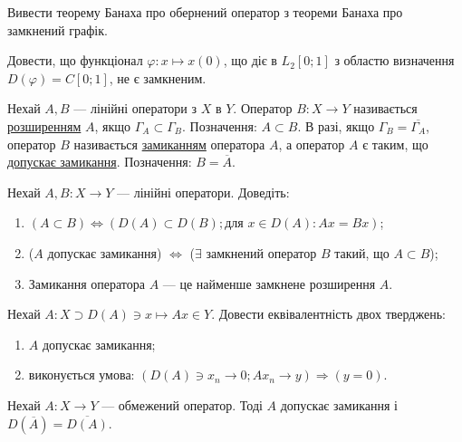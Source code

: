 \begin{exercise}
    Вивести теорему Банаха про обернений оператор з теореми Банаха про 
    замкнений графік.
\end{exercise}

\begin{exercise}
    Довести, що функціонал $\varphi: x \mapsto x(0)$, що діє в 
    $L_2[0; 1]$ з областю визначення $D(\varphi) = C[0; 1]$, не є 
    замкненим.
\end{exercise}

\begin{theory}
    Нехай $A, B$ --- лінійні оператори з $X$ в $Y$. Оператор $B: X 
    \rightarrow Y$ називається \ul{розширенням} $A$, якщо $\Gamma_A 
    \subset \Gamma_B$. Позначення: $A \subset B$. В разі, якщо 
    $\Gamma_B = \overline{\Gamma_A}$, оператор $B$ називається 
    \ul{замиканням} оператора $A$, а оператор $A$ є таким, що 
    \ul{допускає замикання}. Позначення: $B = \overline{A}$.
\end{theory}

\begin{exercise}
    Нехай $A, B: X \rightarrow Y$ --- лінійні оператори. Доведіть:
    \begin{enumerate}
        \item $(A \subset B) \Leftrightarrow (D(A) \subset D(B); 
        \text{для }x \in D(A): Ax = Bx)$;
        \item ($A$ допускає замикання) $\Leftrightarrow$ ($\exists$ 
        замкнений оператор $B$ такий, що $A \subset B$);
        \item Замикання оператора $A$ --- це найменше замкнене 
        розширення $A$.
    \end{enumerate}
\end{exercise}

\begin{exercise}
    Нехай $A: X \supset D(A) \ni x \mapsto Ax \in Y$. Довести 
    еквівалентність двох тверджень:
    \begin{enumerate}
        \item $A$ допускає замикання;
        \item виконується умова: $(D(A) \ni x_n \rightarrow 0; 
        Ax_n \rightarrow y) \Rightarrow (y = 0)$.
    \end{enumerate}
\end{exercise}

\begin{exercise}
    Нехай $A: X \rightarrow Y$ --- обмежений оператор. Тоді $A$ допускає 
    замикання і $D(\overline{A}) = \overline{D(A)}$.
\end{exercise}

